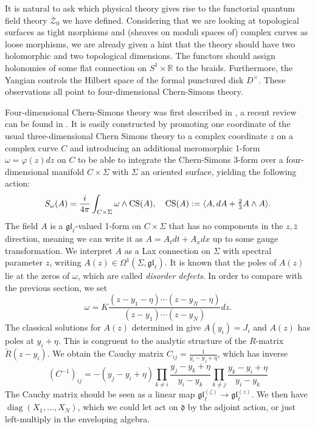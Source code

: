 \documentclass[11pt]{report}
\theoremstyle{definition}
\theoremstyle{remark}
\theoremstyle{remark}
\newcommand{\R}{\mathbb{R}}
\begin{document}
It is natural to ask which physical theory gives rise to the functorial quantum field theory $\overline{\mathcal{Z}}_0$ we have defined. Considering that we are looking at topological surfaces as tight morphisms and (sheaves on moduli spaces of) complex curves as loose morphisms, we are already given a hint that the theory should have two holomorphic and two topological dimensions. The functors should assign holonomies of some flat connection on $S^1 \times \R$ to the braids. Furthermore, the Yangian controls the Hilbert space of the formal punctured disk $D^\times$. These observations all point to four-dimensional Chern-Simons theory.

Four-dimensional Chern-Simons theory was first described in \cite{article:costello:2013}, a recent review can be found in \cite{article:lacroix:2022}. It is easily constructed by promoting one coordinate of the usual three-dimensional Chern Simons theory to a complex coordinate $z$ on a complex curve $C$ and introducing an additional meromorphic 1-form $\omega = \varphi(z) dz$ on $C$ to be able to integrate the Chern-Simons 3-form over a four-dimensional manifold $C \times \Sigma$ with $\Sigma$ an oriented surface, yielding the following action:
\begin{equation*}
S_\omega(A) = \frac{i}{4\pi} \int_{C \times \Sigma} \omega \wedge \textnormal{CS}(A), \quad \textnormal{CS}(A) := \langle A, dA + \tfrac 23 A \wedge A \rangle.
\end{equation*}
The field $A$ is a $\mathfrak{gl}_\ell$-valued 1-form on $C \times \Sigma$ that has no components in the $z,\bar z$ direction, meaning we can write it as $A = A_t dt + A_x dx$ up to some gauge transformation. We interpret $A$ as a Lax connection on $\Sigma$ with spectral parameter $z$, writing $A(z) \in \Omega^1(\Sigma,\mathfrak{gl}_\ell)$. It is known \cite{article:lacroix:2021} that the poles of $A(z)$ lie at the zeros of $\omega$, which are called \emph{disorder defects}. In order to compare with the previous section, we set
\begin{equation*}
\omega = K\frac{(z-y_1-\eta) \cdots (z-y_N-\eta)}{(z-y_1) \cdots (z-y_N)} dz.
\end{equation*}
The classical solutions for $A(z)$ determined in \cite{article:lacroix:2021} give $A(y_i) = J_i$ and $A(z)$ has poles at $y_i+\eta$. This is congruent to the analytic structure of the $R$-matrix $\check R(z-y_i)$. We obtain the Cauchy matrix $C_{ij} = \frac{1}{y_i-y_j+\eta}$, which has inverse
\begin{equation*}
(C^{-1})_{ij} = -(y_j-y_i+\eta) \prod_{k \neq i} \frac{y_j-y_k+\eta}{y_i-y_k} \prod_{k \neq j} \frac{y_k-y_i+\eta}{y_i-y_k}
\end{equation*}
The Cauchy matrix should be seen as a linear map $\mathfrak{gl}_\ell^{(\zeta)} \to \mathfrak{gl}_\ell^{(z)}$. We then have $\operatorname{diag}(X_1,...,X_N)$, which we could let act on $\mathfrak{d}$ by the adjoint action, or just left-multiply in the enveloping algebra.
\end{document}
